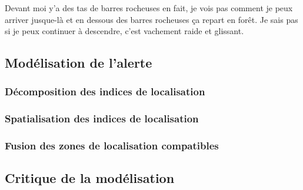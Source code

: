 \begin{dialogue}
  \Req {} Devant moi y’a des tas de barres rocheuses en fait,
  je vois pas comment je peux arriver jusque-là et  en
  dessous des barres rocheuses ça repart en forêt.  Je sais
  pas si je peux continuer à descendre, c’est vachement raide et
  glissant.
\end{dialogue}

\subsection{Modélisation de l'alerte}
\label{subsec:9-3-2}

\subsubsection{Décomposition des indices de localisation}
\label{subsec:9-3-2-2}

\subsubsection{Spatialisation des indices de localisation}
\label{subsec:9-3-2-3}

\subsubsection{Fusion des zones de localisation compatibles}
\label{subsec:9-3-2-4}

\subsection{Critique de la modélisation}
\label{subsec:9-3-3}



